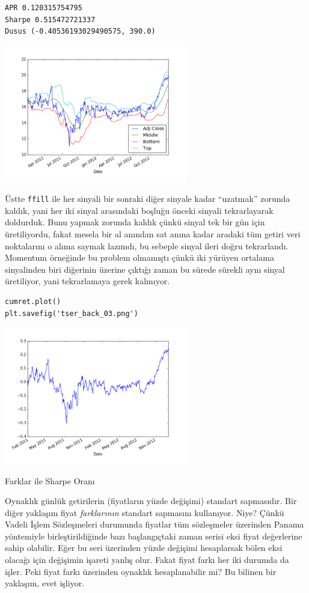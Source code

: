\documentclass[12pt,fleqn]{article}\usepackage{../../common}
\begin{document}
\begin{verbatim}
APR 0.120315754795
Sharpe 0.515472721337
Dusus (-0.40536193029490575, 390.0)
\end{verbatim}

\includegraphics[height=6cm]{tser_back_04.png}

Üstte \verb!ffill! ile her sinyali bir sonraki diğer sinyale kadar ``uzatmak''
zorunda kaldık, yani her iki sinyal arasındaki boşluğu önceki sinyali
tekrarlayarak doldurduk. Bunu yapmak zorunda kaldık çünkü sinyal tek bir gün
için üretiliyordu, fakat mesela bir al anından sat anına kadar aradaki tüm
getiri veri noktalarını o alıma saymak lazımdı, bu sebeple sinyal ileri doğru
tekrarlandı. Momentum örneğinde bu problem olmamıştı çünkü iki yürüyen ortalama
sinyalinden biri diğerinin üzerine çıktığı zaman bu sürede sürekli aynı sinyal
üretiliyor, yani tekrarlamaya gerek kalmıyor. 

\begin{verbatim}
cumret.plot()
plt.savefig('tser_back_03.png')
\end{verbatim}

\includegraphics[height=6cm]{tser_back_03.png}

Farklar ile Sharpe Oranı

Oynaklık günlük getirilerin (fiyatların yüzde değişimi) standart sapmasıdır. Bir
diğer yaklaşım fiyat {\em farklarının} standart sapmasını kullanıyor. Niye?
Çünkü Vadeli İşlem Sözleşmeleri durumunda fiyatlar tüm sözleşmeler üzerinden
Panama yöntemiyle birleştirildiğinde bazı başlangıçtaki zaman serisi eksi fiyat
değerlerine sahip olabilir. Eğer bu seri üzerinden yüzde değişimi hesaplarsak
bölen eksi olacağı için değişimin işareti yanlış olur. Fakat fiyat farkı her iki
durumda da işler. Peki fiyat farkı üzerinden oynaklık hesaplanabilir mi? Bu
bilinen bir yaklaşım, evet işliyor.
\end{document}
